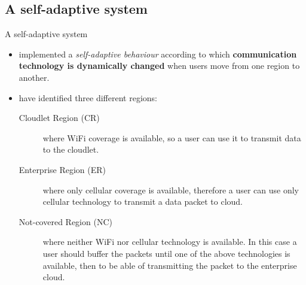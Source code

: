 \documentclass[10pt]{beamer}
\begin{document}
\subsection{A self-adaptive system}
\begin{frame}{A self-adaptive system} 

\begin{itemize}
\item \citet{MSAReport} implemented a \textit{self-adaptive behaviour} according to which \textbf{communication technology is dynamically changed} when users move from one region to another. 

\item \citet{MSAReport} have identified three different regions:\cite[par.~3.1]{MSAReport}
\begin{description}

\item[Cloudlet Region (CR)] where WiFi coverage is available, so a user can use it to transmit data to the cloudlet.

\item[Enterprise Region (ER)] where only cellular coverage is available, therefore  a user can use only cellular technology to transmit a data packet to cloud. 

\item[Not-covered Region (NC)] where neither WiFi nor cellular technology is available. In this case a user should buffer the packets until one of the above technologies is available, then to be able of transmitting the packet to the enterprise cloud. 

\end{description}

\end{itemize}

\end{frame} 
\end{document}
